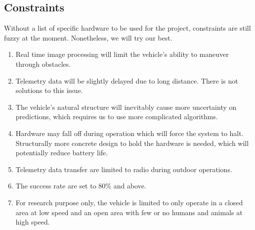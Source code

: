 \documentclass[compsoc,draftclsnofoot,onecolumn,10pt]{IEEEtran}
\begin{document}
\subsection{Constraints} %
Without a list of specific hardware to be used for the project, constraints are
still fuzzy at the moment. Nonetheless, we will try our best.
\begin{enumerate}
	\item Real time image processing will limit the vehicle's ability to maneuver 
	through obstacles. 
	\item Telemetry data will be slightly delayed due to long distance. There is 
	not solutions to this issue.
	\item The vehicle's natural structure will inevitably cause more uncertainty
	on predictions, which requires us to use more complicated algorithms.
	\item Hardware may fall off during operation which will force the system to 
	halt. Structurally more concrete design to hold the hardware is needed, which 
	will potentially reduce battery life.  
	\item Telemetry data transfer are limited to radio during outdoor operations.
	\item The success rate are set to 80\% and above.
	\item For research purpose only, the vehicle is limited to only operate in a 
	closed area at low speed and an open area with few or no humans and animals at
	high speed.
\end{enumerate}
\end{document}
